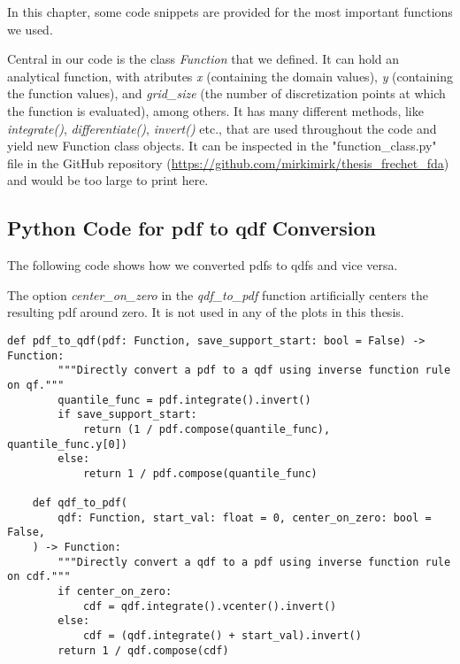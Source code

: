 In this chapter, some code snippets are provided for the most important functions we
used.

Central in our code is the class \textit{Function} that we defined. It can hold an analytical
function, with atributes \textit{x} (containing the domain values), \textit{y} (containing the function
values), and \textit{grid\_size} (the number of discretization points at which the function
is evaluated), among others. It has many different methods, like \textit{integrate()},
\textit{differentiate()}, \textit{invert()} etc., that are used throughout the code and yield new 
Function class objects. It can be inspected in the "function\_class.py" file in the
GitHub repository (\url{https://github.com/mirkimirk/thesis_frechet_fda}) and would be
too large to print here.

\subsection{Python Code for pdf to qdf Conversion}
\label{sec:code_pdf_to_qdf}
The following code shows how we converted pdfs to qdfs and vice versa.

The option \textit{center\_on\_zero} in the \textit{qdf\_to\_pdf} function artificially
centers the resulting pdf around zero. It is not used in any of the plots in this thesis.

\begin{lstlisting}[style=python]
    def pdf_to_qdf(pdf: Function, save_support_start: bool = False) -> Function:
        """Directly convert a pdf to a qdf using inverse function rule on qf."""
        quantile_func = pdf.integrate().invert()
        if save_support_start:
            return (1 / pdf.compose(quantile_func), quantile_func.y[0])
        else:
            return 1 / pdf.compose(quantile_func)
    
    def qdf_to_pdf(
        qdf: Function, start_val: float = 0, center_on_zero: bool = False,
    ) -> Function:
        """Directly convert a qdf to a pdf using inverse function rule on cdf."""
        if center_on_zero:
            cdf = qdf.integrate().vcenter().invert()
        else:
            cdf = (qdf.integrate() + start_val).invert()
        return 1 / qdf.compose(cdf)
\end{lstlisting}

